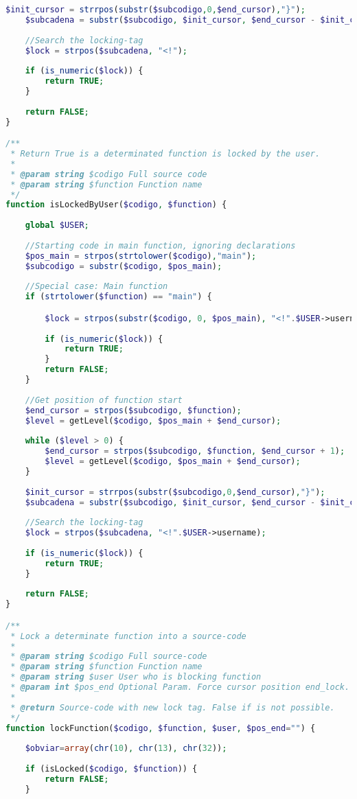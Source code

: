 \begin{lstlisting}[language=PHP]
	$init_cursor = strrpos(substr($subcodigo,0,$end_cursor),"}");
	$subcadena = substr($subcodigo, $init_cursor, $end_cursor - $init_cursor);
	
	//Search the locking-tag
	$lock = strpos($subcadena, "<!");
	
	if (is_numeric($lock)) {
		return TRUE;
	}
	
	return FALSE;
}

/**
 * Return True is a determinated function is locked by the user.
 * 
 * @param string $codigo Full source code
 * @param string $function Function name
 */
function isLockedByUser($codigo, $function) {
					
	global $USER;
	
	//Starting code in main function, ignoring declarations
	$pos_main = strpos(strtolower($codigo),"main");
	$subcodigo = substr($codigo, $pos_main);
	
	//Special case: Main function
	if (strtolower($function) == "main") {

		$lock = strpos(substr($codigo, 0, $pos_main), "<!".$USER->username);
		
		if (is_numeric($lock)) {
			return TRUE;
		}
		return FALSE;
	}
	
	//Get position of function start
	$end_cursor = strpos($subcodigo, $function);
	$level = getLevel($codigo, $pos_main + $end_cursor);
	
	while ($level > 0) {
		$end_cursor = strpos($subcodigo, $function, $end_cursor + 1);
		$level = getLevel($codigo, $pos_main + $end_cursor);
	}
	
	$init_cursor = strrpos(substr($subcodigo,0,$end_cursor),"}");
	$subcadena = substr($subcodigo, $init_cursor, $end_cursor - $init_cursor);
	
	//Search the locking-tag
	$lock = strpos($subcadena, "<!".$USER->username);
	
	if (is_numeric($lock)) {
		return TRUE;
	}
	
	return FALSE;
}

/**
 * Lock a determinate function into a source-code
 * 
 * @param string $codigo Full source-code
 * @param string $function Function name
 * @param string $user User who is blocking function
 * @param int $pos_end Optional Param. Force cursor position end_lock.
 * 
 * @return Source-code with new lock tag. False if is not possible.
 */
function lockFunction($codigo, $function, $user, $pos_end="") {
	
	$obviar=array(chr(10), chr(13), chr(32));
	
	if (isLocked($codigo, $function)) {
		return FALSE;
	}
	

\end{lstlisting}

